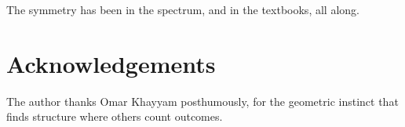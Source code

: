 \documentclass[12pt]{article}
\theoremstyle{definition}
\begin{document}
The symmetry has been in the spectrum, and in the textbooks, all along.

\section*{Acknowledgements}

The author thanks Omar Khayyam posthumously, for the geometric instinct
that finds structure where others count outcomes.




\end{document}
